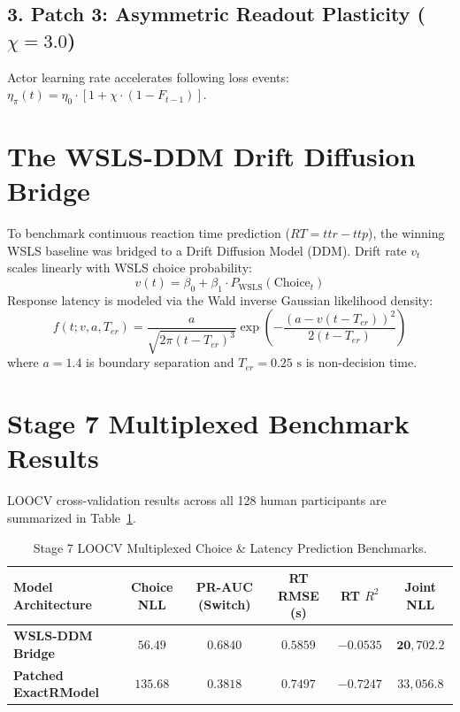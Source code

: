 \documentclass[11pt,a4paper]{article}
\begin{document}
\subsection{3. Patch 3: Asymmetric Readout Plasticity ($\chi = 3.0$)}
Actor learning rate accelerates following loss events: $\eta_\pi(t) = \eta_0 \cdot [1 + \chi \cdot (1 - F_{t-1})]$.

\section{The WSLS-DDM Drift Diffusion Bridge}

To benchmark continuous reaction time prediction ($RT = ttr - ttp$), the winning WSLS baseline was bridged to a Drift Diffusion Model (DDM). Drift rate $v_t$ scales linearly with WSLS choice probability:
\begin{equation}
v(t) = \beta_0 + \beta_1 \cdot P_{\text{WSLS}}(\text{Choice}_t)
\end{equation}
Response latency is modeled via the Wald inverse Gaussian likelihood density:
\begin{equation}
f(t; v, a, T_{er}) = \frac{a}{\sqrt{2\pi (t - T_{er})^3}} \exp\left( -\frac{(a - v(t - T_{er}))^2}{2(t - T_{er})} \right)
\end{equation}
where $a = 1.4$ is boundary separation and $T_{er} = 0.25\text{ s}$ is non-decision time.

\section{Stage 7 Multiplexed Benchmark Results}

LOOCV cross-validation results across all 128 human participants are summarized in Table~\ref{tab:stage7_results}.

\begin{table}[H]
\centering
\caption{Stage 7 LOOCV Multiplexed Choice \& Latency Prediction Benchmarks.}
\label{tab:stage7_results}
\vspace{0.5em}
\small
\begin{tabular}{l c c c c c}
\toprule
\textbf{Model Architecture} & \textbf{Choice NLL} & \textbf{PR-AUC (Switch)} & \textbf{RT RMSE (s)} & \textbf{RT $R^2$} & \textbf{Joint NLL} \\
\midrule
\textbf{WSLS-DDM Bridge} & $\mathbf{56.49}$ & $\mathbf{0.6840}$ & $\mathbf{0.5859}$ & $-0.0535$ & $\mathbf{20,702.2}$ \\
\textbf{Patched ExactRModel} & $135.68$ & $0.3818$ & $0.7497$ & $-0.7247$ & $33,056.8$ \\
\bottomrule
\end{tabular}
\end{table}
\end{document}
